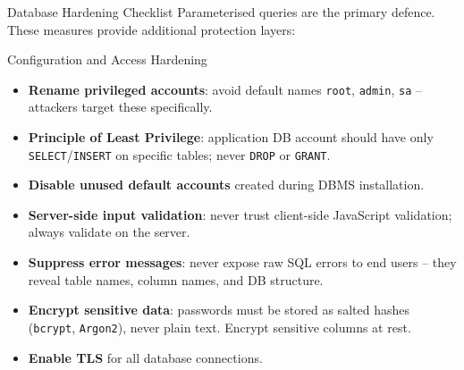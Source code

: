 \begin{frame}{Database Hardening Checklist}
  Parameterised queries are the primary defence. These measures provide additional protection layers:

  \begin{block}{Configuration and Access Hardening}
    \begin{itemize}
      \item \textbf{Rename privileged accounts}: avoid default names \texttt{root}, \texttt{admin},
            \texttt{sa} -- attackers target these specifically.
      \item \textbf{Principle of Least Privilege}: application DB account should have only
            \texttt{SELECT}/\texttt{INSERT} on specific tables; never \texttt{DROP} or \texttt{GRANT}.
      \item \textbf{Disable unused default accounts} created during DBMS installation.
      \item \textbf{Server-side input validation}: never trust client-side JavaScript validation;
            always validate on the server.
      \item \textbf{Suppress error messages}: never expose raw SQL errors to end users -- they
            reveal table names, column names, and DB structure.
      \item \textbf{Encrypt sensitive data}: passwords must be stored as salted hashes
            (\texttt{bcrypt}, \texttt{Argon2}), never plain text. Encrypt sensitive columns at rest.
      \item \textbf{Enable TLS} for all database connections.
    \end{itemize}
  \end{block}
\end{frame}
